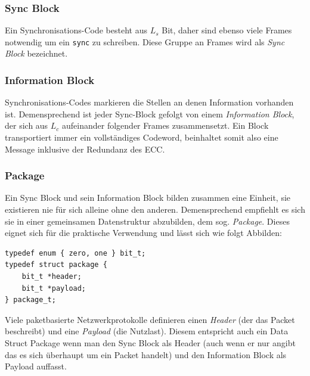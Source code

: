 \subsubsection{Sync Block}

Ein Synchronisations-Code besteht aus $L_s$ Bit, daher sind ebenso viele Frames notwendig um ein \texttt{sync} zu schreiben. Diese Gruppe an Frames wird als \textit{Sync Block} bezeichnet.

\subsubsection{Information Block}
 
Synchronisations-Codes markieren die Stellen an denen Information vorhanden ist. Demensprechend ist jeder Sync-Block gefolgt von einem \textit{Information Block}, der sich aus $L_c$ aufeinander folgender Frames zusammensetzt. Ein Block transportiert immer ein vollständiges Codeword, beinhaltet somit also eine Message inklusive der Redundanz des ECC.

\subsubsection{Package}

Ein Sync Block und sein Information Block bilden zusammen eine Einheit, sie existieren nie für sich alleine ohne den anderen. Demensprechend empfiehlt es sich sie in einer gemeinsamen Datenstruktur abzubilden, dem sog. \textit{Package}. Dieses eignet sich für die praktische Verwendung und lässt sich wie folgt Abbilden:


\lstset{escapechar=@,style=customc}         
\begin{lstlisting}
typedef enum { zero, one } bit_t;
typedef struct package {
    bit_t *header;
    bit_t *payload; 
} package_t;
\end{lstlisting}

Viele paketbasierte Netzwerkprotokolle definieren einen \textit{Header} (der das Packet beschreibt) und eine \textit{Payload} (die \glqq{}Nutzlast\grqq{}). Diesem entspricht auch ein Data Struct Package wenn man den Sync Block als Header (auch wenn er nur angibt das es sich überhaupt um ein Packet handelt) und den Information Block als Payload auffasst.

